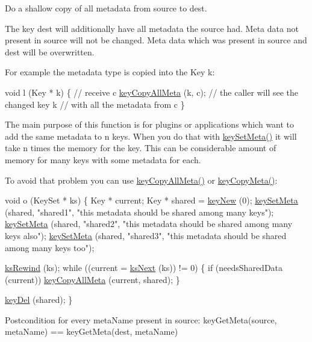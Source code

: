 Do a shallow copy of all metadata from source to dest. 

The key dest will additionally have all metadata the source had. Meta data not present in source will not be changed. Meta data which was present in source and dest will be overwritten.

For example the metadata type is copied into the Key k\+:


\begin{DoxyCodeInclude}
\textcolor{keywordtype}{void} l (Key * k)
\{
        \textcolor{comment}{// receive c}
        \hyperlink{group__keymeta_ga8e63720a65610a29597494d0671f9401}{keyCopyAllMeta} (k, c);
        \textcolor{comment}{// the caller will see the changed key k}
        \textcolor{comment}{// with all the metadata from c}
\}
\end{DoxyCodeInclude}
 The main purpose of this function is for plugins or applications which want to add the same metadata to n keys. When you do that with \hyperlink{group__keymeta_gae1f15546b234ffb6007d8a31178652b9}{key\+Set\+Meta()} it will take n times the memory for the key. This can be considerable amount of memory for many keys with some metadata for each.

To avoid that problem you can use \hyperlink{group__keymeta_ga8e63720a65610a29597494d0671f9401}{key\+Copy\+All\+Meta()} or \hyperlink{group__keymeta_ga9a22b992478e613c8788bd460b4a1f0c}{key\+Copy\+Meta()}\+:


\begin{DoxyCodeInclude}
\textcolor{keywordtype}{void} o (KeySet * ks)
\{
        Key * current;
        Key * shared = \hyperlink{group__key_gad23c65b44bf48d773759e1f9a4d43b89}{keyNew} (0);
        \hyperlink{group__keymeta_gae1f15546b234ffb6007d8a31178652b9}{keySetMeta} (shared, \textcolor{stringliteral}{"shared1"}, \textcolor{stringliteral}{"this metadata should be shared among many keys"});
        \hyperlink{group__keymeta_gae1f15546b234ffb6007d8a31178652b9}{keySetMeta} (shared, \textcolor{stringliteral}{"shared2"}, \textcolor{stringliteral}{"this metadata should be shared among many keys also"});
        \hyperlink{group__keymeta_gae1f15546b234ffb6007d8a31178652b9}{keySetMeta} (shared, \textcolor{stringliteral}{"shared3"}, \textcolor{stringliteral}{"this metadata should be shared among many keys too"});

        \hyperlink{group__keyset_gabe793ff51f1728e3429c84a8a9086b70}{ksRewind} (ks);
        \textcolor{keywordflow}{while} ((current = \hyperlink{group__keyset_ga317321c9065b5a4b3e33fe1c399bcec9}{ksNext} (ks)) != 0)
        \{
                \textcolor{keywordflow}{if} (needsSharedData (current)) \hyperlink{group__keymeta_ga8e63720a65610a29597494d0671f9401}{keyCopyAllMeta} (current, shared);
        \}

        \hyperlink{group__key_ga3df95bbc2494e3e6703ece5639be5bb1}{keyDel} (shared);
\}
\end{DoxyCodeInclude}
 \begin{DoxyPostcond}{Postcondition}
for every meta\+Name present in source\+: key\+Get\+Meta(source, meta\+Name) == key\+Get\+Meta(dest, meta\+Name)
\end{DoxyPostcond}

